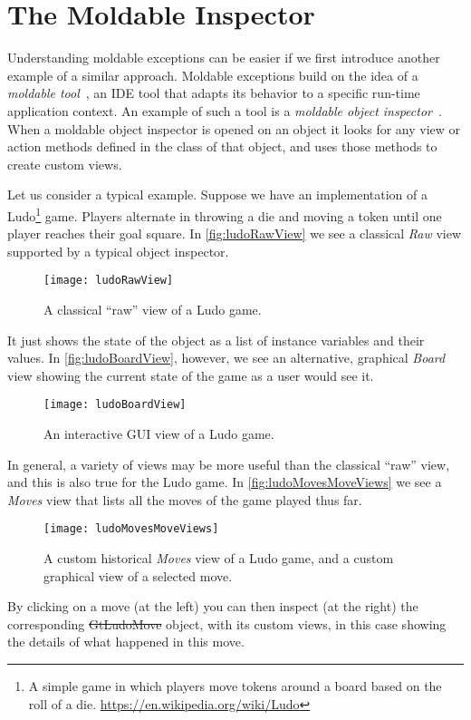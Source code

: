\documentclass[sigplan,screen]{acmart} %
\begin{document}
\section{The Moldable Inspector}\label{sec:inspectorViews}

Understanding moldable exceptions can be easier if we first introduce another example of a similar approach.
Moldable exceptions build on the idea of a \emph{moldable tool}~\cite{Chis17a}, an IDE tool that adapts its behavior to a specific run-time application context.
An example of such a tool is a \emph{moldable object inspector}~\cite{Chis15a}.
When a moldable object inspector is opened on an object it looks for any view or action methods defined in the class of that object, and uses those methods to create custom views.

Let us consider a typical example.
Suppose we have an implementation of a Ludo\footnote{A simple game in which players move tokens around a board based on the roll of a die.
\url{https://en.wikipedia.org/wiki/Ludo}} game.
Players alternate in throwing a die and moving a token until one player reaches their goal square.
In \autoref{fig:ludoRawView} we see a classical \emph{Raw} view supported by a typical object inspector.
\begin{figure}[h]
  \texttt{[image: ludoRawView]}
  \caption{A classical ``raw'' view of a Ludo game.}
  \label{fig:ludoRawView}
\end{figure}
It just shows the state of the object as a list of instance variables and their values.
In \autoref{fig:ludoBoardView}, however, we see an alternative, graphical \emph{Board} view showing the current state of the game as a user would see it.
\begin{figure}[h]
  \texttt{[image: ludoBoardView]}
  \caption{An interactive GUI view of a Ludo game.}
  \label{fig:ludoBoardView}
\end{figure}

In general, a variety of views may be more useful than the classical ``raw'' view, and this is also true for the Ludo game.
In \autoref{fig:ludoMovesMoveViews} we see a \emph{Moves} view that lists all the moves of the game played thus far.
\begin{figure}[h]
  \texttt{[image: ludoMovesMoveViews]}
  \caption{A custom historical \emph{Moves} view of a Ludo game, and a custom graphical view of a selected move.}
  \label{fig:ludoMovesMoveViews}
\end{figure}
By clicking on a move (at the left) you can then inspect (at the right) the corresponding \st{GtLudoMove} object, with its custom views, in this case showing the details of what happened in this move.
\end{document}
